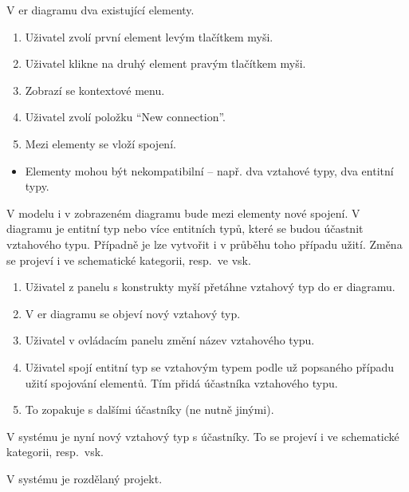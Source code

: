 \ucstart{}
V \acrshort{er} diagramu dva existující elementy.

\ucnormal{}
\begin{enumerate}
  \item Uživatel zvolí první element levým tlačítkem myši.
  \item Uživatel klikne na druhý element pravým tlačítkem myši.
  \item Zobrazí se kontextové menu.
  \item Uživatel zvolí položku \enquote{New connection}.
  \item Mezi elementy se vloží spojení.
\end{enumerate}

\ucerrors{}
\begin{itemize}
  \item Elementy mohou být nekompatibilní -- např. dva vztahové typy, dva entitní typy.
\end{itemize}

\ucend{}
V modelu i v zobrazeném diagramu bude mezi elementy nové spojení.
\ucstart{}
V diagramu je entitní typ nebo více entitních typů, které se budou účastnit vztahového typu.
Případně je lze vytvořit i v průběhu toho případu užití.
Změna se projeví i ve schematické kategorii, resp.~ve \acrshort{vsk}.

\ucnormal{}
\begin{enumerate}
  \item Uživatel z panelu s konstrukty myší přetáhne vztahový typ do \acrshort{er} diagramu.
  \item V \acrshort{er} diagramu se objeví nový vztahový typ.
  \item Uživatel v ovládacím panelu změní název vztahového typu.
  \item Uživatel spojí entitní typ se vztahovým typem podle už popsaného případu užití spojování elementů. Tím přidá účastníka vztahového typu.
  \item To zopakuje s dalšími účastníky (ne nutně jinými).
\end{enumerate}

\ucend{}
V systému je nyní nový vztahový typ s účastníky. To se projeví i ve schematické kategorii, resp.~\acrshort{vsk}.

\ucstart{}
V systému je rozdělaný projekt.

